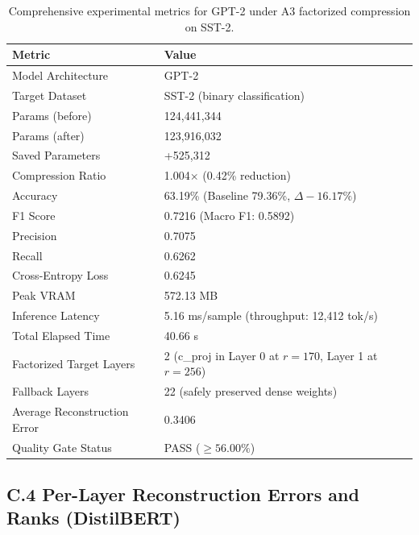 \begin{table}[H]
\centering
\small
\begin{tabular}{ll}
\toprule
\textbf{Metric} & \textbf{Value} \\
\midrule
Model Architecture & GPT-2 \\
Target Dataset & SST-2 (binary classification) \\
Params (before) & 124,441,344 \\
Params (after) & 123,916,032 \\
Saved Parameters & +525,312 \\
Compression Ratio & 1.004$\times$ (0.42\% reduction) \\
Accuracy & 63.19\% (Baseline 79.36\%, $\Delta -16.17\%$) \\
F1 Score & 0.7216 (Macro F1: 0.5892) \\
Precision & 0.7075 \\
Recall & 0.6262 \\
Cross-Entropy Loss & 0.6245 \\
Peak VRAM & 572.13 MB \\
Inference Latency & 5.16 ms/sample (throughput: 12,412 tok/s) \\
Total Elapsed Time & 40.66 s \\
Factorized Target Layers & 2 (c\_proj in Layer 0 at $r=170$, Layer 1 at $r=256$) \\
Fallback Layers & 22 (safely preserved dense weights) \\
Average Reconstruction Error & 0.3406 \\
Quality Gate Status & PASS ($\ge 56.00\%$) \\
\bottomrule
\end{tabular}
\caption{Comprehensive experimental metrics for GPT-2 under A3 factorized compression on SST-2.}
\label{tab:gpt2_full_metrics}
\end{table}

\subsection{C.4 Per-Layer Reconstruction Errors and Ranks (DistilBERT)}

